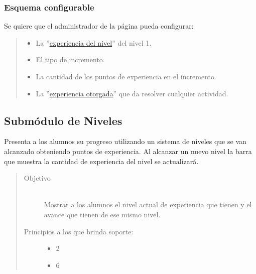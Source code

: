 \subsubsection{Esquema configurable}

 Se quiere que el administrador de la página pueda configurar:
 \begin{quote}
 \begin{itemize}
    \item{La ''\hyperref[table:METerminosExperiencia1]{experiencia del nivel}'' del nivel 1.}
    \item {El tipo de incremento.}
    \item {La cantidad de los puntos de experiencia en el incremento.}
    \item {La ''\hyperref[table:METerminosExperiencia1]{experiencia otorgada}'' que da resolver cualquier actividad.}
 \end{itemize}
 \end{quote}

\subsection{Submódulo de Niveles}

 Presenta a los alumnos su progreso utilizando un sistema de niveles que se van alcanzado
 obteniendo puntos de experiencia. Al alcanzar un nuevo nivel la barra que muestra la
 cantidad de experiencia del nivel se actualizará.

    \begin{quote}
    \begin{description}
    \item[Objetivo] \hfill\\
        Mostrar a los alumnos el nivel actual de experiencia que tienen y el avance que tienen de ese mismo nivel.
        
        
    \item[Principios a los que brinda soporte:] \hfill
        \begin{itemize}
            \item 2 \principioII
            \item 6 \principioVI
        \end{itemize}
    \end{description}
    \end{quote}

